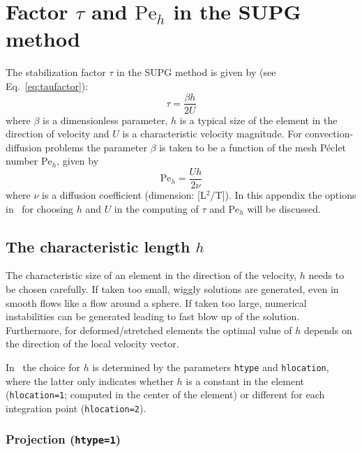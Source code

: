 
\chapter{Factor $\tau$ and $\text{Pe}_h$ in the SUPG method}
\label{chap:tausupg}

\def\chaptertitle{Factor $\tau$ and $\text{Pe}_h$ in the SUPG method}
\def\headdate{11th February 2020}

The stabilization factor $\tau$ in the SUPG
method is given by (see Eq.~\eqref{eq:taufactor}):
\begin{equation}
       \tau = \frac{\beta h}{2 U}
    \label{eq:taufactor_A}
\end{equation}
where $\beta$ is a dimensionless parameter,
$h$ is a typical size of the element in the direction of velocity and $U$ is a
characteristic velocity magnitude. For convection-diffusion problems the parameter $\beta$ is taken to be a function of the mesh P\'{e}clet number $\text{Pe}_h$, given by
\begin{equation}
  \mathrm{Pe}_h = \frac{U h}{2\nu}\label{eq:PehA}
\end{equation}
where $\nu$ is a diffusion coefficient (dimension: [L$^2$/T]).
In this appendix the options in \tfem\ for choosing $h$ and $U$ in the computing of $\tau$ and $\mathrm{Pe}_h$ will be discussed.

\section{The characteristic length $h$}

The characteristic size of an element in the direction of the velocity,
 $h$ needs to be chosen carefully.
If taken too small, wiggly solutions are generated, even in
smooth flows like a flow around a sphere. If taken too large, numerical
instabilities can be generated leading to fast blow up of the solution. Furthermore,
for deformed/stretched elements the optimal value of $h$ depends on the direction
of the local velocity vector.

In \tfem\ the choice for $h$ is determined by the parameters \texttt{htype} and 
\texttt{hlocation}, where the latter only indicates whether $h$ is a constant
in the element (\texttt{hlocation=1}; computed in the center of the element) or
 different for each integration point (\texttt{hlocation=2}).  

\subsection{Projection (\texttt{htype=1})}

